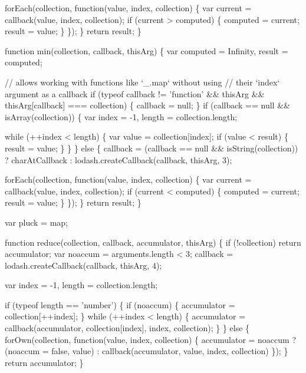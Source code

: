 \begin{DoxyCodeInclude}
        forEach(collection, \textcolor{keyword}{function}(value, index, collection) \{
          var current = callback(value, index, collection);
          \textcolor{keywordflow}{if} (current > computed) \{
            computed = current;
            result = value;
          \}
        \});
      \}
      \textcolor{keywordflow}{return} result;
    \}

    \textcolor{keyword}{function} min(collection, callback, thisArg) \{
      var computed = Infinity,
          result = computed;

      \textcolor{comment}{// allows working with functions like `\_.map` without using}
      \textcolor{comment}{// their `index` argument as a callback}
      \textcolor{keywordflow}{if} (typeof callback != \textcolor{stringliteral}{'function'} && thisArg && thisArg[callback] === collection) \{
        callback = null;
      \}
      \textcolor{keywordflow}{if} (callback == null && isArray(collection)) \{
        var index = -1,
            length = collection.length;

        \textcolor{keywordflow}{while} (++index < length) \{
          var value = collection[index];
          \textcolor{keywordflow}{if} (value < result) \{
            result = value;
          \}
        \}
      \} \textcolor{keywordflow}{else} \{
        callback = (callback == null && isString(collection))
          ? charAtCallback
          : lodash.createCallback(callback, thisArg, 3);

        forEach(collection, \textcolor{keyword}{function}(value, index, collection) \{
          var current = callback(value, index, collection);
          \textcolor{keywordflow}{if} (current < computed) \{
            computed = current;
            result = value;
          \}
        \});
      \}
      \textcolor{keywordflow}{return} result;
    \}

    var pluck = map;

    \textcolor{keyword}{function} reduce(collection, callback, accumulator, thisArg) \{
      \textcolor{keywordflow}{if} (!collection) \textcolor{keywordflow}{return} accumulator;
      var noaccum = arguments.length < 3;
      callback = lodash.createCallback(callback, thisArg, 4);

      var index = -1,
          length = collection.length;

      \textcolor{keywordflow}{if} (typeof length == \textcolor{stringliteral}{'number'}) \{
        \textcolor{keywordflow}{if} (noaccum) \{
          accumulator = collection[++index];
        \}
        \textcolor{keywordflow}{while} (++index < length) \{
          accumulator = callback(accumulator, collection[index], index, collection);
        \}
      \} \textcolor{keywordflow}{else} \{
        forOwn(collection, \textcolor{keyword}{function}(value, index, collection) \{
          accumulator = noaccum
            ? (noaccum = \textcolor{keyword}{false}, value)
            : callback(accumulator, value, index, collection)
        \});
      \}
      \textcolor{keywordflow}{return} accumulator;
    \}


\end{DoxyCodeInclude}

